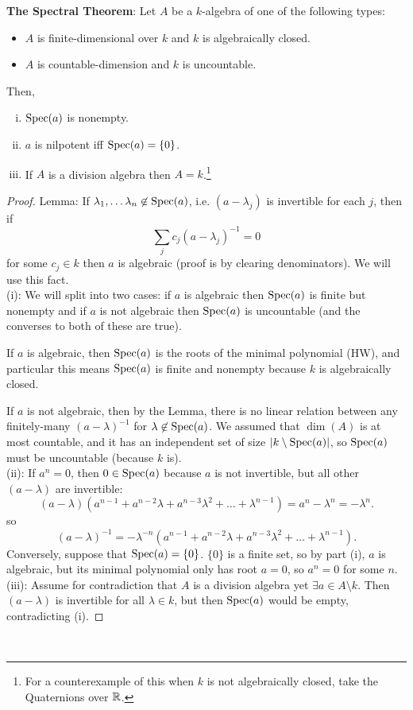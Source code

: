 \documentclass{amsart}
\begin{document}
\textbf{The Spectral Theorem}: Let $A$ be a $k$-algebra of one of the following types:
\begin{itemize}
	\item $A$ is finite-dimensional over $k$ and $k$ is algebraically closed.
	\item $A$ is countable-dimension and $k$ is uncountable.
\end{itemize}
Then,
\begin{enumerate}[(i)]
	\item $\operatorname{Spec}(a)$ is nonempty.
	\item $a$ is nilpotent iff $\operatorname{Spec}(a)=\{0\}$.
	\item If $A$ is a division algebra then $A=k$.\footnote{For a counterexample of this when $k$ is not algebraically closed, take the Quaternions over $\mathbb{R}$.}
\end{enumerate}
\begin{proof}
	Lemma: If $\lambda_1,\dots\lambda_n\not\in \operatorname{Spec}(a)$, i.e. $(a-\lambda_j)$ is invertible for each $j$, then if 
	$$
	\sum_j c_j(a-\lambda_j)^{-1} = 0
	$$
	for some $c_j\in k$ then $a$ is algebraic (proof is by clearing denominators). We will use this fact.\\
	
	(i): We will split into two cases: if $a$ is algebraic then $\operatorname{Spec}(a)$ is finite but nonempty and if $a$ is not algebraic then $\operatorname{Spec}(a)$ is uncountable (and the converses to both of these are true).
	
	If $a$ is algebraic, then $\operatorname{Spec}(a)$ is the roots of the minimal polynomial (HW), and particular this means $\operatorname{Spec}(a)$ is finite and nonempty because $k$ is algebraically closed.
	
	If $a$ is not algebraic, then by the Lemma, there is no linear relation between any finitely-many $(a-\lambda)^{-1}$ for $\lambda\not\in \operatorname{Spec}(a)$. We assumed that $\dim(A)$ is at most countable, and it has an independent set of size $|k\setminus \operatorname{Spec}(a)|$, so $\operatorname{Spec}(a)$ must be uncountable (because $k$ is).\\
	
	(ii): If $a^n=0$, then $0\in \operatorname{Spec}(a)$ because $a$ is not invertible, but all other $(a-\lambda)$ are invertible:
	$$
	(a-\lambda)(a^{n-1}+a^{n-2}\lambda + a^{n-3}\lambda^2 + \dots + \lambda^{n-1}) = a^n-\lambda^n = -\lambda^n.
	$$
	so
	$$
	(a-\lambda)^{-1} = -\lambda^{-n}(a^{n-1}+a^{n-2}\lambda + a^{n-3}\lambda^2 + \dots + \lambda^{n-1}).
	$$
	Conversely, suppose that $\operatorname{Spec}(a)=\{0\}$. $\{0\}$ is a finite set, so by part (i), $a$ is algebraic, but its minimal polynomial only has root $a=0$, so $a^n=0$ for some $n$.
	\\
	
	(iii): Assume for contradiction that $A$ is a division algebra yet $\exists a\in A\setminus k$. Then $(a-\lambda)$ is invertible for all $\lambda \in k$, but then $\operatorname{Spec}(a)$ would be empty, contradicting (i).
\end{proof}\\
\end{document}
